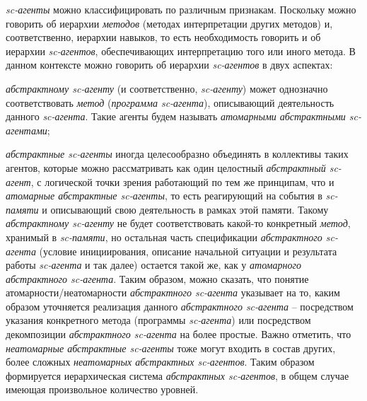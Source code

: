 \textit{sc-агенты} можно классифицировать по различным признакам. Поскольку можно говорить об иерархии \textit{методов} (методах интерпретации других методов) и, соответственно, иерархии навыков, то есть необходимость говорить и об иерархии \textit{sc-агентов}, обеспечивающих интерпретацию того или иного метода. В данном контексте можно говорить об иерархии \textit{sc-агентов} в двух аспектах:
\begin{textitemize}
	\item \textit{абстрактному sc-агенту} (и соответственно, \textit{sc-агенту}) может однозначно соответствовать \textit{метод} (\textit{программа sc-агента}), описывающий деятельность данного \textit{sc-агента}. Такие агенты будем называть \textit{атомарными абстрактными sc-агентами};
	\item \textit{абстрактные sc-агенты} иногда целесообразно объединять в коллективы таких агентов, которые можно рассматривать как один целостный \textit{абстрактный sc-агент}, с логической точки зрения работающий по тем же принципам, что и \textit{атомарные абстрактные sc-агенты}, то есть реагирующий на события в \textit{sc-памяти} и описывающий свою деятельность в рамках этой памяти. Такому \textit{абстрактному sc-агенту} не будет соответствовать какой-то конкретный \textit{метод}, хранимый в \textit{sc-памяти}, но остальная часть спецификации \textit{абстрактного sc-агента} (условие инициирования, описание начальной ситуации и результата работы \textit{sc-агента} и так далее) остается такой же, как у \textit{атомарного абстрактного sc-агента}. Таким образом, можно сказать, что понятие атомарности/неатомарности \textit{абстрактного sc-агента} указывает на то, каким образом уточняется реализация данного \textit{абстрактного sc-агента} -- посредством указания конкретного метода (программы \textit{sc-агента}) или посредством декомпозиции \textit{абстрактного sc-агента} на более простые. Важно отметить, что \textit{неатомарные абстрактные sc-агенты} тоже могут входить в состав других, более сложных \textit{неатомарных абстрактных sc-агентов}. Таким образом формируется иерархическая система \textit{абстрактных sc-агентов}, в общем случае имеющая произвольное количество уровней. 

\end{textitemize}
